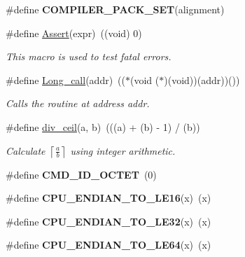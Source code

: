 \begin{DoxyCompactItemize}
\item 
\hypertarget{group__group__xmega__utils_gae2c02ff865ca6538b4b1bddbf2a6876c}{\#define {\bfseries C\-O\-M\-P\-I\-L\-E\-R\-\_\-\-P\-A\-C\-K\-\_\-\-S\-E\-T}(alignment)}\label{group__group__xmega__utils_gae2c02ff865ca6538b4b1bddbf2a6876c}

\item 
\#define \hyperlink{group__group__xmega__utils_gaab1e54dcc40192f9704e8b252635450f}{Assert}(expr)~((void) 0)
\begin{DoxyCompactList}\small\item\em This macro is used to test fatal errors. \end{DoxyCompactList}\item 
\#define \hyperlink{group__group__xmega__utils_ga5b759626f343cc1af9159cc02b763837}{Long\-\_\-call}(addr)~(($\ast$(void ($\ast$)(void))(addr))())
\begin{DoxyCompactList}\small\item\em Calls the routine at address {\itshape addr}. \end{DoxyCompactList}\item 
\#define \hyperlink{group__group__xmega__utils_ga6d4ebd841bc96041a7f3a61e227c1fb2}{div\-\_\-ceil}(a, b)~(((a) + (b) -\/ 1) / (b))
\begin{DoxyCompactList}\small\item\em Calculate $ \left\lceil \frac{a}{b} \right\rceil $ using integer arithmetic. \end{DoxyCompactList}\item 
\hypertarget{group__group__xmega__utils_gabf2b95fa77301377cdcf79eb615551db}{\#define {\bfseries C\-M\-D\-\_\-\-I\-D\-\_\-\-O\-C\-T\-E\-T}~(0)}\label{group__group__xmega__utils_gabf2b95fa77301377cdcf79eb615551db}

\item 
\hypertarget{group__group__xmega__utils_ga7c15ca0f3159182efc4b80a00768c2c0}{\#define {\bfseries C\-P\-U\-\_\-\-E\-N\-D\-I\-A\-N\-\_\-\-T\-O\-\_\-\-L\-E16}(x)~(x)}\label{group__group__xmega__utils_ga7c15ca0f3159182efc4b80a00768c2c0}

\item 
\hypertarget{group__group__xmega__utils_gaa2fd4bfb7af44220ce4205e2aa371017}{\#define {\bfseries C\-P\-U\-\_\-\-E\-N\-D\-I\-A\-N\-\_\-\-T\-O\-\_\-\-L\-E32}(x)~(x)}\label{group__group__xmega__utils_gaa2fd4bfb7af44220ce4205e2aa371017}

\item 
\hypertarget{group__group__xmega__utils_ga6f1e86f452c8f327f9ca96cbf6a65c81}{\#define {\bfseries C\-P\-U\-\_\-\-E\-N\-D\-I\-A\-N\-\_\-\-T\-O\-\_\-\-L\-E64}(x)~(x)}\label{group__group__xmega__utils_ga6f1e86f452c8f327f9ca96cbf6a65c81}


\end{DoxyCompactItemize}
